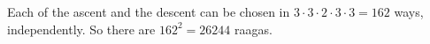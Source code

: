 Each of the ascent and the descent can be chosen in $3\cdot3\cdot2\cdot3\cdot3=162$ ways, independently. So there are $162^2=\boxed{26244}$ raagas.
